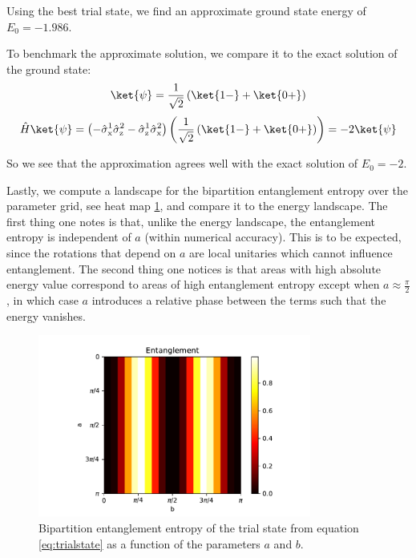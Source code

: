 Using the best trial state, we find an approximate ground state energy of $E_0 = -1.986$.

To benchmark the approximate solution, we compare it to the exact solution of the ground state:
\begin{equation}
    \ket{\mathrm{\psi}} = \frac{1}{\sqrt{2}} \left(\ket{1-} + \ket{0+} \right)
\end{equation}
\begin{equation}
    \hat{H}\ket{\psi} = \left(-\sigmax^1\sigmaz^2 - \sigmaz^1\sigmax^2 \right) \left(\frac{1}{\sqrt{2}} \left(\ket{1-} + \ket{0+} \right)\right) = -2\ket{\psi}
\end{equation}

So we see that the approximation agrees well with the exact solution of $E_0 = -2$.

Lastly, we compute a landscape for the bipartition entanglement entropy over the parameter grid, see heat map \ref{fig:Ex15}, and compare it to the energy landscape. The first thing one notes is that, unlike the energy landscape, the entanglement entropy is independent of $a$ (within numerical accuracy). This is to be expected, since the rotations that depend on $a$ are local unitaries which cannot influence entanglement. The second thing one notices is that areas with high absolute energy value correspond to areas of high entanglement entropy except when $a\approx\frac{\pi}{2}$, in which case $a$ introduces a relative phase between the terms such that the energy vanishes.
\begin{figure}
    \centering
    \includegraphics[width = 0.8\textwidth]{tex/figures/exercise15.pdf}
    \caption{Bipartition entanglement entropy of the trial state from equation \eqref{eq:trialstate} as a function of the parameters $a$ and $b$.}
    \label{fig:Ex15}
\end{figure}